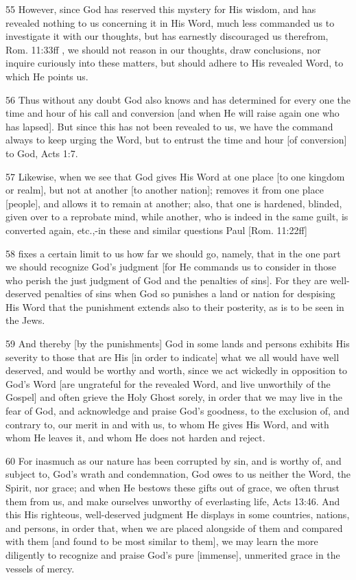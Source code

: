 {55 However, since God has reserved this mystery for His wisdom, and has revealed nothing to us concerning it in His Word, much less commanded us to investigate it with our thoughts, but has earnestly discouraged us therefrom, Rom. 11:33ff , we should not reason in our thoughts, draw conclusions, nor inquire curiously into these matters, but should adhere to His revealed Word, to which He points us.

56 Thus without any doubt God also knows and has determined for every one the time and hour of his call and conversion [and when He will raise again one who has lapsed]. But since this has not been revealed to us, we have the command always to keep urging the Word, but to entrust the time and hour [of conversion] to God, Acts 1:7.

57 Likewise, when we see that God gives His Word at one place [to one kingdom or realm], but not at another [to another nation]; removes it from one place [people], and allows it to remain at another; also, that one is hardened, blinded, given over to a reprobate mind, while another, who is indeed in the same guilt, is converted again, etc.,-in these and similar questions Paul [Rom. 11:22ff]

58 fixes a certain limit to us how far we should go, namely, that in the one part we should recognize God’s judgment [for He commands us to consider in those who perish the just judgment of God and the penalties of sins]. For they are well-deserved penalties of sins when God so punishes a land or nation for despising His Word that the punishment extends also to their posterity, as is to be seen in the Jews.

59 And thereby [by the punishments] God in some lands and persons exhibits His severity to those that are His [in order to indicate] what we all would have well deserved, and would be worthy and worth, since we act wickedly in opposition to God’s Word [are ungrateful for the revealed Word, and live unworthily of the Gospel] and often grieve the Holy Ghost sorely, in order that we may live in the fear of God, and acknowledge and praise God’s goodness, to the exclusion of, and contrary to, our merit in and with us, to whom He gives His Word, and with whom He leaves it, and whom He does not harden and reject.

60 For inasmuch as our nature has been corrupted by sin, and is worthy of, and subject to, God’s wrath and condemnation, God owes to us neither the Word, the Spirit, nor grace; and when He bestows these gifts out of grace, we often thrust them from us, and make ourselves unworthy of everlasting life, Acts 13:46. And this His righteous, well-deserved judgment He displays in some countries, nations, and persons, in order that, when we are placed alongside of them and compared with them [and found to be most similar to them], we may learn the more diligently to recognize and praise God’s pure [immense], unmerited grace in the vessels of mercy.

}
